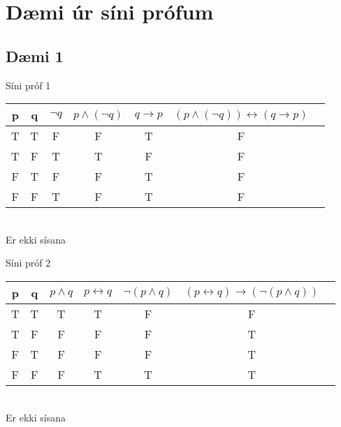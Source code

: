 \section*{Dæmi úr síni prófum}
\subsection*{Dæmi 1}
Síni próf 1
\begin{center}
    \vspace{-1cm}
    \begin{tabular}{ c|c|c|c|c|c|c }
        p & q & $\lnot q$ & $p \wedge (\lnot q)$ & $q \to p$ & $(p \wedge (\lnot q)) \leftrightarrow (q \to p)$
        \\ \hline
        T & T & F & F & T & F
        \\ \hline
        T & F & T & T & F & F
        \\ \hline
        F & T & F & F & T & F
        \\ \hline
        F & F & T & F & T & F
    \end{tabular}\\
    \vspace{0.5mm}
    \hspace{-8.7cm}Er ekki sísana
\end{center} \vspace{0.5cm}
Síni próf 2
\begin{center}
    \vspace{-1cm}
    \begin{tabular}{ c|c|c|c|c|c|c }
        p & q & $p \wedge q$ & $p \leftrightarrow q$ & $\lnot (p \wedge q)$ & $(p \leftrightarrow q) \to (\lnot(p \wedge q))$
        \\ \hline
        T & T & T & T & F & F
        \\ \hline
        T & F & F & F & F & T
        \\ \hline
        F & T & F & F & F & T
        \\ \hline
        F & F & F & T & T & T 
    \end{tabular}\\
    \vspace{0.5mm}
    \hspace{-8.7cm}Er ekki sísana
\end{center}

